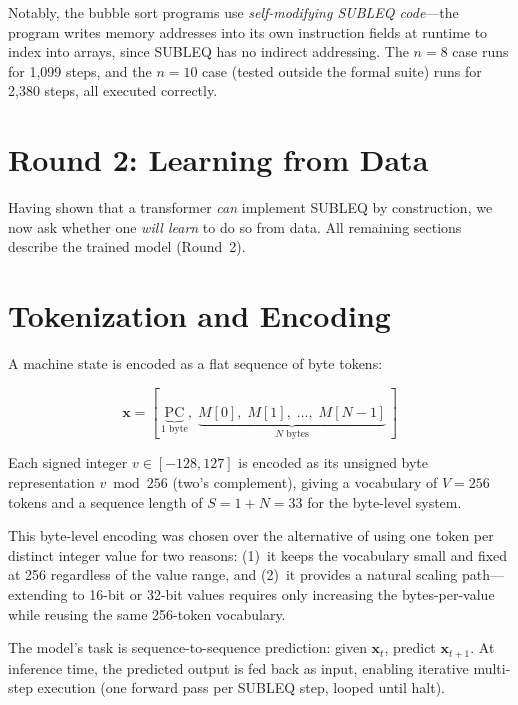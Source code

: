 \documentclass[11pt,a4paper]{article}
\begin{document}
Notably, the bubble sort programs use \emph{self-modifying SUBLEQ code}---the program writes memory addresses into its own instruction fields at runtime to index into arrays, since SUBLEQ has no indirect addressing.
The $n = 8$ case runs for 1{,}099 steps, and the $n = 10$ case (tested outside the formal suite) runs for 2{,}380 steps, all executed correctly.

\section{Round 2: Learning from Data}
\label{sec:round2}

Having shown that a transformer \emph{can} implement SUBLEQ by construction, we now ask whether one \emph{will learn} to do so from data.
All remaining sections describe the trained model (Round~2).

\section{Tokenization and Encoding}
\label{sec:encoding}

A machine state is encoded as a flat sequence of byte tokens:

\begin{equation}
  \mathbf{x} = [\,\underbrace{\mathrm{PC}}_{\text{1 byte}},\; \underbrace{M[0],\; M[1],\; \ldots,\; M[N{-}1]}_{\text{$N$ bytes}}\,]
\end{equation}

Each signed integer $v \in [-128, 127]$ is encoded as its unsigned byte representation $v \bmod 256$ (two's complement), giving a vocabulary of $V = 256$ tokens and a sequence length of $S = 1 + N = 33$ for the byte-level system.

This byte-level encoding was chosen over the alternative of using one token per distinct integer value for two reasons: (1)~it keeps the vocabulary small and fixed at 256 regardless of the value range, and (2)~it provides a natural scaling path---extending to 16-bit or 32-bit values requires only increasing the bytes-per-value while reusing the same 256-token vocabulary.

The model's task is sequence-to-sequence prediction: given $\mathbf{x}_t$, predict $\mathbf{x}_{t+1}$.
At inference time, the predicted output is fed back as input, enabling iterative multi-step execution (one forward pass per SUBLEQ step, looped until halt).
\end{document}
